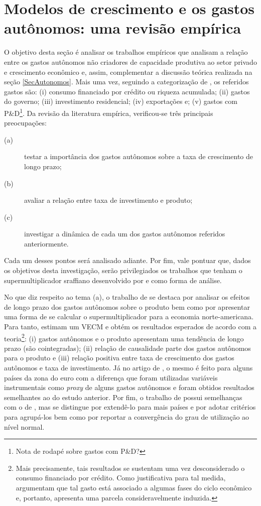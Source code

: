\section{Modelos de crescimento e os gastos autônomos: uma revisão empírica}
\label{RevF}

O objetivo desta seção é analisar os trabalhos empíricos que analisam a relação entre os gastos autônomos não criadores de capacidade produtiva ao setor privado e crescimento econômico e, assim, complementar a discussão teórica realizada na seção \ref{SecAutonomos}. Mais uma vez, seguindo a categorização de \textcite{cesaratto_technical_2003}, os referidos gastos são:
(i) consumo financiado por crédito ou riqueza acumulada;
(ii) gastos do governo;
(iii) investimento residencial;
(iv) exportações e;
(v) gastos com P\&D\footnote{
	Nota de rodapé sobre gastos com P\&D?
}. 
Da revisão da literatura empírica, verificou-se três principais preocupações: 
\begin{description}
	\item[(a)] testar a importância dos gastos autônomos sobre a taxa de crescimento de longo prazo; 
	\item[(b)] avaliar a relação entre taxa de investimento e produto;
	\item[(c)] investigar a dinâmica de cada um dos gastos autônomos referidos anteriormente.
\end{description}
Cada um desses pontos será analisado adiante. Por fim, vale pontuar que, dados os objetivos desta investigação, serão privilegiados os trabalhos que tenham o supermultiplicador sraffiano desenvolvido por \textcite{serrano_long_1995} e \textcite{bortis_institutions_1996} como forma de análise.

No que diz respeito ao tema (a), o trabalho de \textcite{girardi_long-run_2016} se destaca por analisar os efeitos de longo prazo dos gastos autônomos sobre o produto bem como por apresentar uma forma de se calcular o supermultiplicador para a economia norte-americana. Para tanto, estimam um VECM e obtém os resultados esperados de acordo com a teoria\footnote{Mais precisamente, tais resultados se sustentam uma vez desconsiderado o consumo financiado por crédito. Como justificativa para tal medida, \textcite[p.~13]{girardi_long-run_2016} argumentam que tal gasto está associado a algumas fases do ciclo econômico e, portanto, apresenta uma parcela consideravelmente induzida.}: (i) gastos autônomos e o produto apresentam uma tendência de longo prazo (são cointegradas); (ii) relação de causalidade parte dos gastos autônomos para o produto e (iii) relação positiva entre taxa de crescimento dos gastos autônomos e taxa de investimento. Já no artigo de \textcite{girardi_autonomous_2018}, o mesmo é feito para alguns países da zona do euro com a diferença que foram utilizadas variáveis instrumentais como \textit{proxy} de alguns gastos autônomos e foram obtidos resultados semelhantes ao do estudo anterior. Por fim, o trabalho de \textcite{goes_supermultiplier_2018} possui semelhanças com o de \textcite{girardi_long-run_2016}, mas se distingue por extendê-lo para mais países e por adotar critérios para agrupá-los bem como por reportar a convergência do grau de utilização ao nível normal.

